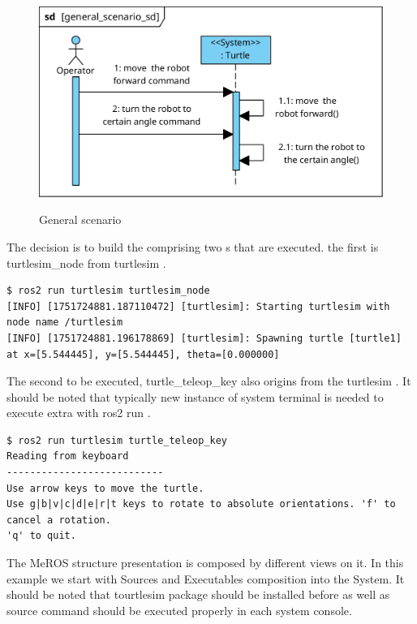\documentclass[11pt,oneside,a4paper]{report}
\begin{document}
\begin{figure}[H]
	\centering
	\begin{center}
		{\includegraphics[scale=1.0]{diagrams/general_scenario_sd.png}}
	\end{center}
	\caption{General scenario}
	\label{fig:general_scenario_sd}
\end{figure}


The decision is to build the \stSystem{} comprising two \stNode{}s that are executed. the first is \textsf{turtlesim\_node} \stNode{} from \textsf{turtlesim} \stPackage{}.

\begin{lstlisting}[style=terminal]
$ ros2 run turtlesim turtlesim_node
[INFO] [1751724881.187110472] [turtlesim]: Starting turtlesim with node name /turtlesim
[INFO] [1751724881.196178869] [turtlesim]: Spawning turtle [turtle1] at x=[5.544445], y=[5.544445], theta=[0.000000]
\end{lstlisting}

The second \stNode{} to be executed, \textsf{turtle\_teleop\_key} also origins from the \textsf{turtlesim} \stPackage{}. It should be noted that typically new instance of system terminal is needed to execute extra \stNode{} with \textsf{ros2 run} \stCLTool{}.

\begin{lstlisting}[style=terminal]
$ ros2 run turtlesim turtle_teleop_key
Reading from keyboard
---------------------------
Use arrow keys to move the turtle.
Use g|b|v|c|d|e|r|t keys to rotate to absolute orientations. 'f' to cancel a rotation.
'q' to quit.
\end{lstlisting}



The MeROS \stSystem{} structure presentation is composed by different views on it. In this example we start with Sources and Executables composition into the System. It should be noted that tourtlesim package should be installed before as well as  source command should be executed properly in each system console.
\end{document}
